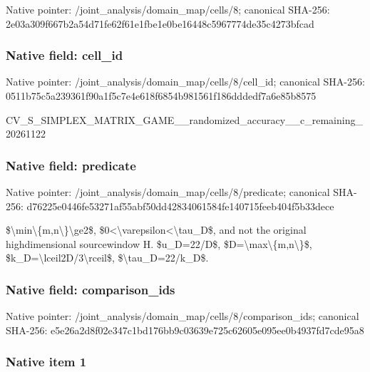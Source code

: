 \documentclass[10pt,a4paper]{article}
\begin{document}
Native pointer: /joint\_analysis/domain\_map/cells/8; canonical SHA-256: 2e03a309f667b2a54d71fe62\allowbreak{}f61e1fbe1e0be16448c59677\allowbreak{}74de35c4273bfcad



\subsubsection{Native field: cell\_id}


Native pointer: /joint\_analysis/domain\_m\allowbreak{}ap/cells/8/cell\_id; canonical SHA-256: 0511b75c5a239361f90a1f5c\allowbreak{}7e4e618f6854b981561f186d\allowbreak{}ddedf7a6e85b8575


CV\_S\_SIMPLEX\_MATRIX\_GAME\allowbreak{}\_\_randomized\_accuracy\_\_c\allowbreak{}\_remaining\_20261122


\subsubsection{Native field: predicate}


Native pointer: /joint\_analysis/domain\_m\allowbreak{}ap/cells/8/predicate; canonical SHA-256: d76225e0446fe53271af55ab\allowbreak{}f50dd42834061584fe140715\allowbreak{}feeb404f5b33dece


\$\textbackslash{}min\textbackslash{}\{m,n\textbackslash{}\}\textbackslash{}ge2\$, \$0<\textbackslash{}varepsilon<\textbackslash{}tau\_D\$, and not the original highdimensional sourcewindow H. \$u\_D=22/D\$, \$D=\textbackslash{}max\textbackslash{}\{m,n\textbackslash{}\}\$, \$k\_D=\textbackslash{}lceil2D/3\textbackslash{}rceil\$, \$\textbackslash{}tau\_D=22/k\_D\$.


\subsubsection{Native field: comparison\_ids}


Native pointer: /joint\_analysis/domain\_m\allowbreak{}ap/cells/8/comparison\_id\allowbreak{}s; canonical SHA-256: e5e26a2d8f02e347c1bd176b\allowbreak{}b9c03639e725c62605e095ee\allowbreak{}0b4937fd7cde95a8



\subsubsection{Native item 1}
\end{document}
